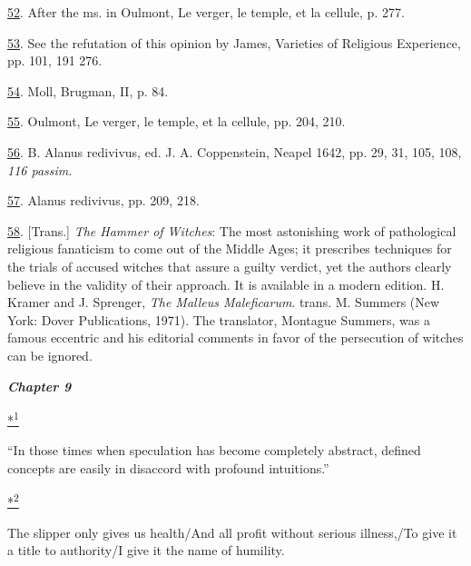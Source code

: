 \protect\hypertarget{23_NOTES.xhtmlux5cux23id_805}{\protect\hyperlink{15_Chapter_Eight__RELIGIOUS_EXCITAT.xhtmlux5cux23id_804}{52}}.
After the ms. in Oulmont, Le verger, le temple, et la cellule, p. 277.

\protect\hypertarget{23_NOTES.xhtmlux5cux23id_803}{\protect\hyperlink{15_Chapter_Eight__RELIGIOUS_EXCITAT.xhtmlux5cux23id_802}{53}}.
See the refutation of this opinion by James, Varieties of Religious
Experience, pp. 101, 191 276.

\protect\hypertarget{23_NOTES.xhtmlux5cux23id_801}{\protect\hyperlink{15_Chapter_Eight__RELIGIOUS_EXCITAT.xhtmlux5cux23id_800}{54}}.
Moll, Brugman, II, p. 84.

\protect\hypertarget{23_NOTES.xhtmlux5cux23id_799}{\protect\hyperlink{15_Chapter_Eight__RELIGIOUS_EXCITAT.xhtmlux5cux23id_798}{55}}.
Oulmont, Le verger, le temple, et la cellule, pp. 204, 210.

\protect\hypertarget{23_NOTES.xhtmlux5cux23id_797}{\protect\hyperlink{15_Chapter_Eight__RELIGIOUS_EXCITAT.xhtmlux5cux23id_796}{56}}.
B. Alanus redivivus, ed. J. A. Coppenstein, Neapel 1642, pp. 29, 31,
105, 108, \emph{116 passim}.

\protect\hypertarget{23_NOTES.xhtmlux5cux23id_795}{\protect\hyperlink{15_Chapter_Eight__RELIGIOUS_EXCITAT.xhtmlux5cux23id_794}{57}}.
Alanus redivivus, pp. 209, 218.

\protect\hypertarget{23_NOTES.xhtmlux5cux23id_793}{\protect\hyperlink{15_Chapter_Eight__RELIGIOUS_EXCITAT.xhtmlux5cux23id_792}{58}}.
{[}Trans.{]} \emph{The Hammer of Witches}: The most astonishing work of
pathological religious fanaticism to come out of the Middle Ages; it
prescribes techniques for the trials of accused witches that assure a
guilty verdict, yet the authors clearly believe in the validity of their
approach. It is available in a modern edition. H. Kramer and J.
Sprenger, \emph{The Malleus Maleficarum}. trans. M. Summers (New York:
Dover Publications, 1971). The translator, Montague Summers, was a
famous eccentric and his editorial comments in favor of the persecution
of witches can be ignored.

\textbf{\emph{Chapter 9}}

\protect\hypertarget{23_NOTES.xhtmlux5cux23id_2574}{\protect\hyperlink{16_Chapter_Nine__THE_DECLINE_OF_SYM.xhtmlux5cux23id_2573}{*\textsuperscript{1}}}
``In those times when speculation has become completely abstract,
defined concepts are easily in disaccord with profound intuitions.''

\protect\hypertarget{23_NOTES.xhtmlux5cux23id_2576}{\protect\hyperlink{16_Chapter_Nine__THE_DECLINE_OF_SYM.xhtmlux5cux23id_2575}{*\textsuperscript{2}}}
The slipper only gives us health/And all profit without serious
illness,/To give it a title to authority/I give it the name of humility.

